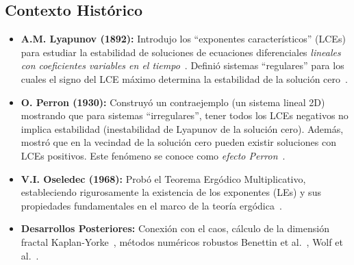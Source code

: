 \subsection{Contexto Histórico}
\begin{itemize}
    \item \textbf{A.M. Lyapunov (1892):} Introdujo los ``exponentes característicos'' (LCEs) para estudiar la estabilidad de soluciones de ecuaciones diferenciales \textit{lineales con coeficientes variables en el tiempo}~\cite{Lyapunov1992}. Definió sistemas ``regulares'' para los cuales el signo del LCE máximo determina la estabilidad de la solución cero~\cite{Leonov2007}.
    \item \textbf{O. Perron (1930):} Construyó un contraejemplo (un sistema lineal 2D) mostrando que para sistemas ``irregulares'', tener todos los LCEs negativos no implica estabilidad (inestabilidad de Lyapunov de la solución cero). Además, mostró que en la vecindad de la solución cero pueden existir soluciones con LCEs positivos. Este fenómeno se conoce como \textit{efecto Perron}~\cite{Leonov2007, Kuznetsov2005}.
    \item \textbf{V.I. Oseledec (1968):} Probó el Teorema Ergódico Multiplicativo, estableciendo rigurosamente la existencia de los exponentes (LEs) y sus propiedades fundamentales en el marco de la teoría ergódica~\cite{Oseledec1968}.
    \item \textbf{Desarrollos Posteriores:} Conexión con el caos, cálculo de la dimensión fractal Kaplan-Yorke~\cite{KaplanYorke1979}, métodos numéricos robustos Benettin et al.~\cite{Benettin1980}, Wolf et al.~\cite{Wolf1985}.
\end{itemize}

